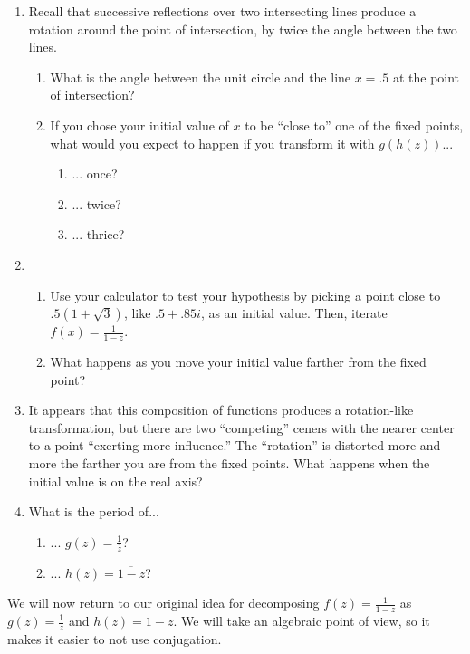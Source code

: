 \documentclass[../gatm.tex]{subfiles}
\begin{document}
\begin{enumerate}
\item Recall that successive reflections over two intersecting lines produce a rotation around the point of intersection, by twice the angle between the two lines.
\begin{enumerate}
\item What is the angle between the unit circle and the line $x=.5$ at the point of intersection?
\item If you chose your initial value of $x$ to be ``close to'' one of the fixed points, what would you expect to happen if you transform it with $g(h(z))$...
\begin{multicols}{3}
\begin{enumerate}
\item ... once?
\item ... twice?
\item ... thrice?
\end{enumerate}
\end{multicols}
\end{enumerate}
\item \begin{enumerate}
\item Use your calculator to test your hypothesis by picking a point close to $.5(1+\sqrt{3})$, like $.5+.85i$, as an initial value. Then, iterate $f(x)=\frac{1}{1-z}$.
\item What happens as you move your initial value farther from the fixed point?
\end{enumerate}
\item It appears that this composition of functions produces a rotation-like transformation, but there are two ``competing'' ceners with the nearer center to a point ``exerting more influence.'' The ``rotation'' is distorted more and more the farther you are from the fixed points. What happens when the initial value is on the real axis?
\item What is the period of...
\begin{enumerate}
\item ... $g(z)=\frac{1}{\overline{z}}$?
\item ... $h(z)=\overline{1-z}$?
\end{enumerate}
\end{enumerate}

We will now return to our original idea for decomposing $f(z)=\frac{1}{1-z}$ as $g(z)=\frac{1}{z}$ and $h(z)=1-z$. We will take an algebraic point of view, so it makes it easier to not use conjugation.
\end{document}
